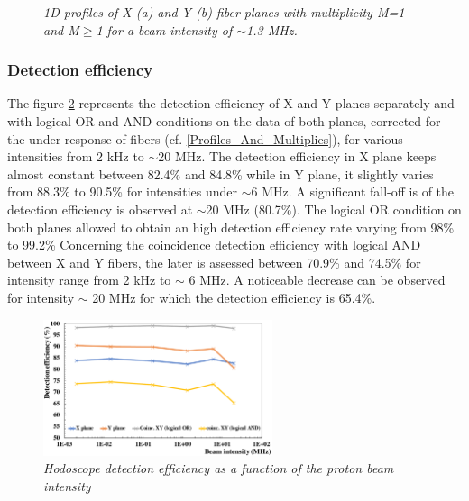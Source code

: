 \documentclass[a4paper,11pt]{article}
\begin{document}
\begin{figure}[H]
\begin{subfigure}{0.47\textwidth}
    \end{subfigure}
\caption{\small{\textit{1D profiles of X (a) and Y (b) fiber planes with multiplicity M=1 and M$\geq$1 for a beam intensity of $\sim${1.3} MHz.}}}
\label{fig:1D_Profiles}
\end{figure}


\subsubsection{Detection efficiency}

The figure \ref{fig:DE} represents the detection efficiency of X and Y planes separately and with logical OR and AND conditions on the data of both planes, corrected for the under-response of fibers (cf. \ref{Profiles_And_Multiplies}), for various intensities from 2 kHz to $\sim$20 MHz.
The detection efficiency in X plane keeps almost constant between 82.4\% and 84.8\% while in Y plane, it slightly varies from 88.3\% to 90.5\% for intensities under $\sim$6 MHz. A significant fall-off is of the detection efficiency is observed at $\sim$20 MHz (80.7\%). The logical OR condition on both planes allowed to obtain an high detection efficiency rate varying from 98\% to 99.2\%
Concerning the coincidence detection efficiency with logical AND between X and Y fibers, the later is assessed between 70.9\% and 74.5\% for intensity range from 2 kHz to $\sim$ 6 MHz. A noticeable decrease can be observed for intensity $\sim$ 20 MHz for which the detection efficiency is 65.4\%.

\begin{figure}[H]
\centering
\includegraphics[width=0.6\textwidth]{figures/DE_March_2019_corr.pdf}
\caption{\small{\textit{Hodoscope  detection  efficiency  as  a  function  of  the proton beam intensity}}}
\label{fig:DE}
\end{figure}
\end{document}
